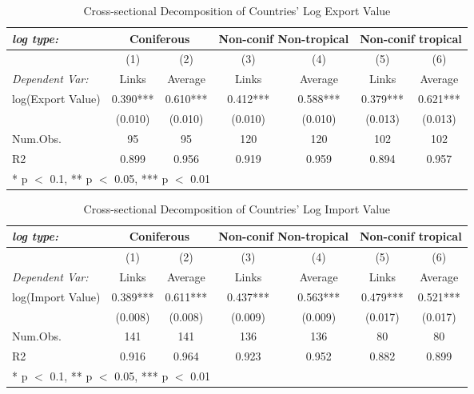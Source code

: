 \documentclass[a4paper,12pt]{article}
\begin{document}
\begin{table}[htbp]
    \centering
    \caption{Cross-sectional Decomposition of Countries' Log Export Value}
    \begin{tabular}[t]{lcccccc}
    \toprule
    \textit{log type:} &  \multicolumn{2}{c}{Coniferous}&  \multicolumn{2}{c}{Non-conif Non-tropical}&  \multicolumn{2}{c}{Non-conif tropical}\\
    \midrule
      & (1) & (2) & (3) & (4) & (5) & (6)\\
      \textit{Dependent Var:}& Links & Average & Links & Average & Links & Average \\
    \midrule
    log(Export Value)  & \num{0.390}*** & \num{0.610}*** & \num{0.412}*** & \num{0.588}*** & \num{0.379}*** & \num{0.621}***\\
    & (\num{0.010}) & (\num{0.010}) & (\num{0.010}) & (\num{0.010}) & (\num{0.013}) & (\num{0.013})\\
   \midrule
   Num.Obs. & \num{95} & \num{95} & \num{120} & \num{120} & \num{102} & \num{102}\\
   R2 & \num{0.899} & \num{0.956} & \num{0.919} & \num{0.959} & \num{0.894} & \num{0.957}\\
   \bottomrule
   \multicolumn{7}{l}{\rule{0pt}{1em}* p $<$ 0.1, ** p $<$ 0.05, *** p $<$ 0.01}\\
   \end{tabular}
   \label{tab:decomp_exp}
   \end{table}

\begin{table}[htbp]
    \centering
    \caption{Cross-sectional Decomposition of Countries' Log Import Value}
    \begin{tabular}[t]{lcccccc}
    \toprule
    \textit{log type:} &  \multicolumn{2}{c}{Coniferous}&  \multicolumn{2}{c}{Non-conif Non-tropical}&  \multicolumn{2}{c}{Non-conif tropical}\\
    \midrule
      & (1) & (2) & (3) & (4) & (5) & (6)\\
      \textit{Dependent Var:}& Links & Average & Links & Average & Links & Average \\
    \midrule
    log(Import Value) & \num{0.389}*** & \num{0.611}*** & \num{0.437}*** & \num{0.563}*** & \num{0.479}*** & \num{0.521}***\\
    & (\num{0.008}) & (\num{0.008}) & (\num{0.009}) & (\num{0.009}) & (\num{0.017}) & (\num{0.017})\\
   \midrule
   Num.Obs. & \num{141} & \num{141} & \num{136} & \num{136} & \num{80} & \num{80}\\
   R2 & \num{0.916} & \num{0.964} & \num{0.923} & \num{0.952} & \num{0.882} & \num{0.899}\\
   \bottomrule
   \multicolumn{7}{l}{\rule{0pt}{1em}* p $<$ 0.1, ** p $<$ 0.05, *** p $<$ 0.01}\\
   \end{tabular}
   \label{tab:decomp_imp}
   \end{table}
\end{document}
